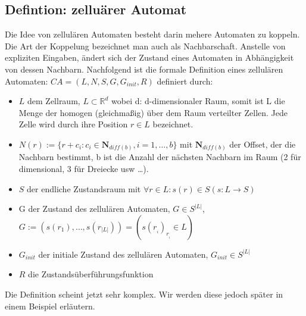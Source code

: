 \documentclass[11pt, fleqn, a4paper, leqno]{scrartcl} %
\begin{document}
	\subsection{Defintion: zelluärer Automat}
		Die Idee von zellulären Automaten besteht darin mehere Automaten zu koppeln. Die Art der Koppelung bezeichnet man auch als Nachbarschaft. Anstelle von expliziten Eingaben, ändert sich der Zustand eines Automaten in Abhängigkeit von dessen Nachbarn. Nachfolgend ist die formale Definition eines zellulären Automaten: $CA=(L,N,S,G,G_{init},R)$ definiert durch:
		\begin{itemize}
			\item $L$ dem Zellraum, $L \subset \mathds{R}^{d}$ wobei d: d-dimensionaler Raum, somit ist L die Menge der homogen (gleichmaßig) über dem Raum verteilter Zellen. Jede Zelle wird durch ihre Position $r\in L$ bezeichnet.
			\item $N(r) := \{r+c_{i}:c_{i} \in \mathbf{N}_{diff(b)}, i = 1,\dots,b\}$ mit $\mathbf{N}_{diff(b)}$ der Offset, der die Nachbarn bestimmt, b ist die Anzahl der nächsten Nachbarn im Raum (2 für dimensional, 3 für Dreiecke usw \dots).
			\item $S$ der endliche Zustandsraum  mit $\forall r \in L : s(r) \in S (s : L \rightarrow S)$
			\item G der Zustand des zellulären Automaten, $G \in S^{|L|}$,$G := (s(r_{1}),\dots,s(r_{|L|})) = (s(r_{_{i}})_{r_{_{i}}} \in L)$
			\item $G_{init}$ der initiale Zustand des zellulären Automaten, $G_{init} \in S^{|L|}$
			\item $R$ die Zustandsüberführungsfunktion
		\end{itemize}
		Die Definition scheint jetzt sehr komplex. Wir werden diese jedoch später in einem Beispiel erläutern.
\end{document}
